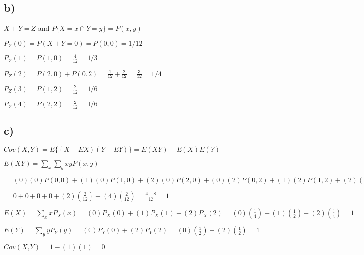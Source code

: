 \documentclass[12pt]{article}
\begin{document}
\subsection*{b)}
$X + Y = Z$ and $P\lbrace X = x \cap Y = y \rbrace = P(x,y)$\\ \par 
$P_Z(0) = P(X + Y = 0) = P(0,0) = 1/12$\\ \par 
$P_Z(1) = P(1,0) = \frac{4}{12} = 1/3$\\ \par 
$P_Z(2) = P(2,0) + P(0,2) = \frac{1}{12} + \frac{2}{12} = \frac{3}{12} = 1/4$ \\ \par 
$P_Z(3) = P(1,2) = \frac{2}{12} = 1/6$\\ \par 
$P_Z(4) = P(2,2) = \frac{2}{12} = 1/6$
\subsection*{c)}
$Cov(X,Y) = E \lbrace (X - EX)(Y - EY) \rbrace = E(XY) - E(X)E(Y)$\\ \par 
$E(XY) = \sum_x \sum_y xyP(x,y)$\\ \par 
$= (0)(0)P(0,0) + (1)(0)P(1,0) + (2)(0)P(2,0) + (0)(2)P(0,2) + (1)(2)P(1,2) + (2)(2)P(2,2)$\\ \par 
$= 0 + 0 + 0 + 0 + (2)(\frac{2}{12}) + (4)(\frac{2}{12}) = \frac{4 + 8}{12} = 1$
\\ \par 
$E(X) = \sum_x xP_X(x) = (0)P_X(0) + (1)P_X(1) + (2)P_X(2) = (0)(\frac{1}{4}) + (1)(\frac{1}{2}) + (2)(\frac{1}{4}) = 1$\\ \par 
$E(Y) = \sum_y yP_Y(y) = (0)P_Y(0) + (2)P_Y(2) = (0)(\frac{1}{2}) + (2)(\frac{1}{2}) = 1$\\ \par 
$Cov(X,Y) = 1 - (1)(1) = 0$
\end{document}
